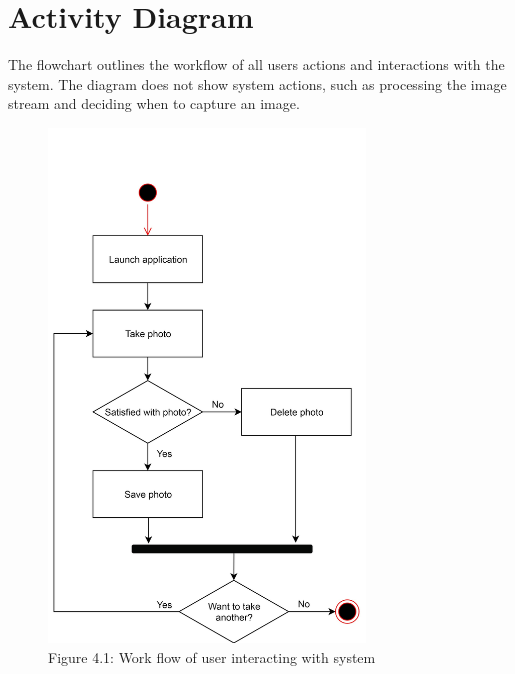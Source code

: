 \chapter{Activity Diagram}

The flowchart outlines the workflow of all users actions and interactions with the system. The diagram does not show system actions, such as processing the image stream and deciding when to capture an image.

\begin{figure}[!h]
    \centering
    \includegraphics[width=0.75\textwidth]{activitydiagram}
    \caption{Figure 4.1: Work flow of user interacting with system}
    \label{fig:activitydiagram}
\end{figure}


